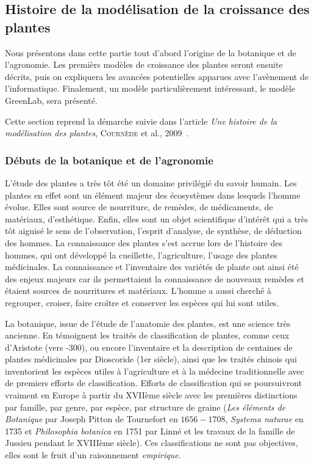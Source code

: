 \subsection{Histoire de la modélisation de la croissance des plantes}
Nous présentons dans cette partie tout d'abord l'origine
de la botanique et de l'agronomie. Les premièrs modèles
de croissance des plantes seront ensuite décrits,
puis on expliquera les avancées potentielles apparues avec
l'avènement de l'informatique.
Finalement, un modèle particulièrement intéressant,
le modèle GreenLab, sera présenté.


Cette section reprend la démarche suivie dans 
l'article \emph{Une histoire de la modélisation des plantes}, \textsc{Cournède} et al., 2009~\cite{histoire_mod_plantes}.

\subsubsection{Débuts de la botanique et de l'agronomie}
L’étude des plantes a très tôt été un domaine privilégié du savoir humain.
Les plantes en effet sont un élément majeur des écosystèmes dans lesquels l’homme évolue. Elles sont source de nourriture, de remèdes, de médicaments,
de matériaux, d’esthétique. 
Enfin, elles sont un objet scientifique d’intérêt qui a très tôt aiguisé le sens de l’observation, l’esprit d’analyse, de synthèse, de déduction des hommes. 
La connaissance des plantes s’est accrue lors de l’histoire des hommes, qui ont développé la cueillette, l’agriculture, l’usage des plantes
médicinales. 
La connaissance et l’inventaire des variétés de plante ont ainsi été des
enjeux majeurs car ils permettaient la connaissance de nouveaux remèdes
et étaient sources de nourritures et matériaux. 
L’homme a aussi cherché à regrouper, croiser, faire croître 
et conserver les espèces qui lui sont utiles.

La botanique, issue de l’étude de l’anatomie des plantes,
est une science très ancienne.
En témoignent les traités de classification de plantes, comme ceux
d’Aristote (vers -300), ou encore l’inventaire et la description de
centaines de plantes médicinales par Dioscoride (1er siècle),
ainsi que les traités chinois qui inventorient les espèces utiles à
l’agriculture et à la médecine traditionnelle avec de premiers efforts
de classification. 
Efforts de classification qui se poursuivront vraiment en Europe à partir du
XVIIème siècle avec les premières distinctions par famille, par genre,
par espèce, par structure de graine (\emph{Les éléments de Botanique} par
Joseph Pitton de Tournefort en $1656-1708$, \emph{Systema naturae} en 1735
et \emph{Philosophia botanica} en 1751 par Linné et les travaux de la
famille de Jussieu pendant le XVIIIème siècle).
Ces classifications ne sont pas objectives, 
elles sont le fruit d’un raisonnement \emph{empirique}.

